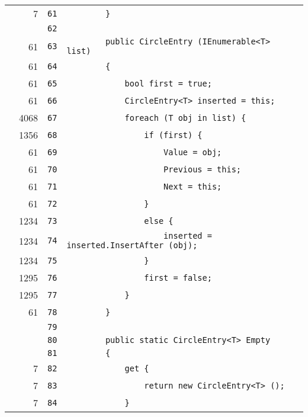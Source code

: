 \documentclass[a4paper,10pt]{article}
\begin{document}
\begin{longtable}[l]{lrrl}
\cellcolor{green} & 7 & \verb~61~ & \verb~        }~\\
\cellcolor{gray} &  & \verb~62~ & \verb~~\\
\cellcolor{green} & 61 & \verb~63~ & \verb~        public CircleEntry (IEnumerable<T> list)~\\
\cellcolor{green} & 61 & \verb~64~ & \verb~        {~\\
\cellcolor{green} & 61 & \verb~65~ & \verb~            bool first = true;~\\
\cellcolor{green} & 61 & \verb~66~ & \verb~            CircleEntry<T> inserted = this;~\\
\cellcolor{green} & 4068 & \verb~67~ & \verb~            foreach (T obj in list) {~\\
\cellcolor{green} & 1356 & \verb~68~ & \verb~                if (first) {~\\
\cellcolor{green} & 61 & \verb~69~ & \verb~                    Value = obj;~\\
\cellcolor{green} & 61 & \verb~70~ & \verb~                    Previous = this;~\\
\cellcolor{green} & 61 & \verb~71~ & \verb~                    Next = this;~\\
\cellcolor{green} & 61 & \verb~72~ & \verb~                }~\\
\cellcolor{green} & 1234 & \verb~73~ & \verb~                else {~\\
\cellcolor{green} & 1234 & \verb~74~ & \verb~                    inserted = inserted.InsertAfter (obj);~\\
\cellcolor{green} & 1234 & \verb~75~ & \verb~                }~\\
\cellcolor{green} & 1295 & \verb~76~ & \verb~                first = false;~\\
\cellcolor{green} & 1295 & \verb~77~ & \verb~            }~\\
\cellcolor{green} & 61 & \verb~78~ & \verb~        }~\\
\cellcolor{gray} &  & \verb~79~ & \verb~~\\
\cellcolor{gray} &  & \verb~80~ & \verb~        public static CircleEntry<T> Empty~\\
\cellcolor{gray} &  & \verb~81~ & \verb~        {~\\
\cellcolor{green} & 7 & \verb~82~ & \verb~            get {~\\
\cellcolor{green} & 7 & \verb~83~ & \verb~                return new CircleEntry<T> ();~\\
\cellcolor{green} & 7 & \verb~84~ & \verb~            }~\\

\end{longtable}
\end{document}
